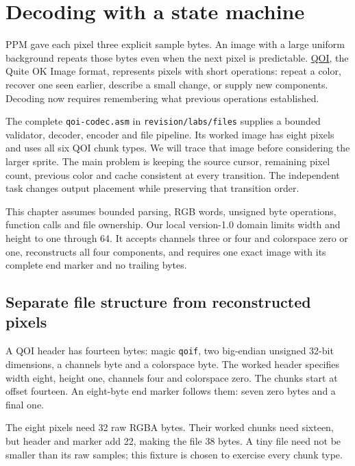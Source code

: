 \chapter{Decoding with a state machine}
\label{revision:qoi}

PPM gave each pixel three explicit sample bytes. An image with a large uniform
background repeats those bytes even when the next pixel is predictable. \href{https://qoiformat.org/qoi-specification.pdf}{QOI},
the Quite OK Image format, represents pixels with short operations: repeat a
color, recover one seen earlier, describe a small change, or supply new components.
Decoding now requires remembering what previous operations established.

The complete \texttt{qoi-codec.asm} in \texttt{revision/labs/files} supplies a
bounded validator, decoder, encoder and file pipeline. Its worked image has
eight pixels and uses all six QOI chunk types. We will trace that image before
considering the larger sprite. The main problem is keeping the source cursor,
remaining pixel count, previous color and cache consistent at every transition.
The independent task changes output placement while preserving that transition
order.

This chapter assumes bounded parsing, RGB words, unsigned byte operations,
function calls and file ownership. Our local version-1.0 domain limits width
and height to one through 64. It accepts channels three or four and colorspace
zero or one, reconstructs all four components, and requires one exact image
with its complete end marker and no trailing bytes.

\section{Separate file structure from reconstructed pixels}

A QOI header has fourteen bytes: magic \texttt{qoif}, two big-endian unsigned
32-bit dimensions, a channels byte and a colorspace byte. The worked header
specifies width eight, height one, channels four and colorspace zero. The chunks
start at offset fourteen. An eight-byte end marker follows them: seven zero
bytes and a final one.

The eight pixels need 32 raw RGBA bytes. Their worked chunks need sixteen,
but header and marker add 22, making the file 38 bytes. A tiny file need not be
smaller than its raw samples; this fixture is chosen to exercise every chunk type.

